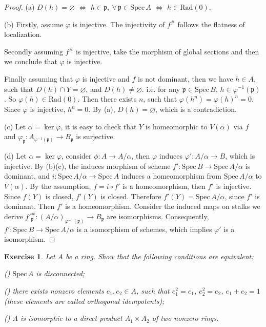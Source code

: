 \documentclass[12pt]{amsart}
\newtheorem{exe}{Exercise}[subsection]
\begin{document}
\begin{proof}
(a) $D(h)=\varnothing$ $\Leftrightarrow$ $h\in \mathfrak{p},\ \forall\, \mathfrak{p}\in \mathrm{Spec}\,A$ $\Leftrightarrow$ $h\in \mathrm{Rad}(0)$. 

(b) Firstly, assume $\varphi$ is injective. The injectivity of $f^\#$ follows the flatness of localization.

Secondly assuming $f^\#$ is injective, take the morphism of global sections and then we conclude that $\varphi$ is injective.

Finally assuming that $\varphi$ is injective and $f$ is not dominant, then we have $h\in A$, such that $D(h)\cap Y=\varnothing$, and $D(h)\neq\varnothing$. i.e. for any $\mathfrak{p}\in \mathrm{Spec}\,B$, $h\in\varphi^{-1}(\mathfrak{p})$.
So $\varphi(h)\in \mathrm{Rad}(0)$. Then there exists $n$, such that $\varphi(h^n)=\varphi(h)^n=0$. Since $\varphi$
is injective, $h^n=0$. By (a), $D(h)=\varnothing$, which is a contradiction.

(c) Let $\alpha=\ker\varphi$, it is easy to check that $Y$ is homeomorphic to $V(\alpha)$ via $f$ and
$\varphi_\mathfrak{p}: A_{\varphi^{-1}(\mathfrak{p})}\longrightarrow B_\mathfrak{p}$ is surjective.

(d) Let $\alpha=\ker\varphi$, consider $\phi:A\rightarrow A/\alpha$, then $\varphi$ induces $\varphi':A/\alpha \rightarrow B $,
which is injective. By (b)(c), the induces morphism of scheme $f':\mathrm{Spec}\,B\rightarrow \mathrm{Spec}\,A/\alpha$ is dominant, and
$i:\mathrm{Spec}\,A/\alpha\rightarrow \mathrm{Spec}\,A$ induces a homeomorphism from $\mathrm{Spec}\,A/\alpha$ to $V(\alpha)$. By the assumption, $f=i\circ f'$ is
a homeomorphism, then $f'$ is injective. Since $f(Y)$ is closed, $f'(Y)$ is closed. Therefore $f'(Y)=\mathrm{Spec}\,A/\alpha$, since $f'$ is dominant.
Then $f'$ is a homeomorphism. Consider the induced maps on stalks we derive $f'^\#_\mathfrak{p}:(A/\alpha)_{\varphi^{-1}(\mathfrak{p})}\rightarrow B_\mathfrak{p}$ are isomorphisms.
Consequently, $f': \mathrm{Spec}\,B \rightarrow \mathrm{Spec}\,A/\alpha$ is a isomorphism of schemes, which implies $\varphi'$ is a isomorphism.
\end{proof}

\begin{exe}
Let $A$ be a ring. Show that the following conditions are equivalent:

\textup{()} $\mathrm{Spec}\,A$ is disconnected;

\textup{()} there exists nonzero elements $ e_1,e_2\in A$, such that $e_1^2=e_1$, $e_2^2=e_2$, $e_1+e_2=1$ (these elements are called \emph{orthogonal idempotents});

\textup{()} $A$ is isomorphic to a direct product $A_1\times A_2$ of two nonzero rings.
\end{exe}
\end{document}
